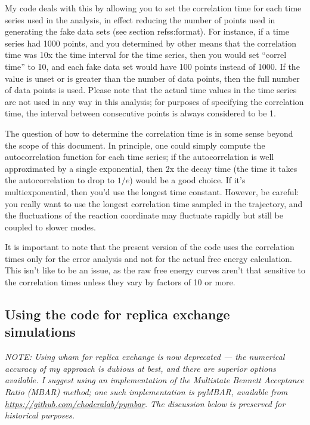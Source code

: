 \documentclass[12pt]{article}
\begin{document}
My code deals with this by allowing you to set the correlation time for each
time series used in the analysis, in effect reducing the number of points
used in generating the fake data sets (see section ref{ss:format}).  For
instance, if a time series had 1000 points, and you determined by other means
that the correlation time was 10x the time interval for the time series, then
you would set ``correl time'' to 10, and each fake data set would have 100
points instead of 1000.  If the value is unset or is greater than the number
of data points, then the full number of data points is used.  Please note
that the actual time values in the time series are not used in any way in
this analysis; for purposes of specifying the correlation time, the interval
between consecutive points is always considered to be 1.

The question of how to determine the correlation time is in some sense beyond
the scope of this document.  In principle, one could simply compute the
autocorrelation function for each time series; if the autocorrelation is well
approximated by a single exponential, then 2x the decay time (the time it
takes the autocorrelation to drop to $1/e$) would be a good choice.  If it's
multiexponential, then you'd use the longest time constant.  However, be
careful: you really want to use the longest correlation time sampled in the
trajectory, and the fluctuations of the reaction coordinate may fluctuate
rapidly but still be coupled to slower modes.

It is important to note that the present version of the code uses the
correlation times only for the error analysis and not for the actual free energy
calculation.  This isn't like to be an issue, as the raw free energy curves
aren't that sensitive to the correlation times unless they vary by factors of 10
or more.


\subsection{Using the code for replica exchange simulations}
\label{ss:repex}

\emph{ NOTE: Using wham for replica exchange is now deprecated --- the numerical
accuracy of my approach is dubious at best, and there are superior options
available. I suggest using an implementation of the Multistate Bennett
Acceptance Ratio (MBAR) method; one such implementation is pyMBAR, available
from \url{https://github.com/choderalab/pymbar}. The discussion below is
preserved for historical purposes.  }
\end{document}
